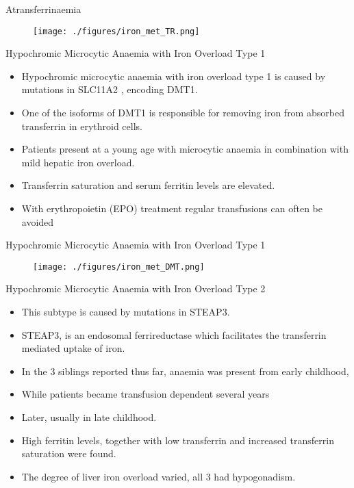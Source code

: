 \documentclass[presentation, smaller]{beamer}
\begin{document}
\begin{frame}[label={sec:orgbae116c}]{Atransferrinaemia}
\begin{figure}[htbp]
\centering
\texttt{[image: ./figures/iron\_met\_TR.png]}
\label{fig:org99f6424}
\end{figure}
\end{frame}

\begin{frame}[label={sec:org8612c05}]{Hypochromic Microcytic Anaemia with Iron Overload Type 1}
\begin{itemize}
\item Hypochromic microcytic anaemia with iron overload type 1 is caused
by mutations in SLC11A2 , encoding DMT1.
\item One of the isoforms of DMT1 is responsible for removing iron from
absorbed transferrin in erythroid cells.
\item Patients present at a young age with microcytic anaemia in combination with
mild hepatic iron overload.
\item Transferrin saturation and serum ferritin levels are elevated.
\item With erythropoietin (EPO) treatment regular transfusions can often be avoided
\end{itemize}
\end{frame}


\begin{frame}[label={sec:org6f03d0a}]{Hypochromic Microcytic Anaemia with Iron Overload Type 1}
\begin{figure}[htbp]
\centering
\texttt{[image: ./figures/iron\_met\_DMT.png]}
\label{fig:orgf687d9d}
\end{figure}
\end{frame}


\begin{frame}[label={sec:orgab1c567}]{Hypochromic Microcytic Anaemia with Iron Overload Type 2}
\begin{itemize}
\item This subtype is caused by mutations in STEAP3.
\item STEAP3, is an endosomal ferrireductase which facilitates the
transferrin mediated uptake of iron.
\item In the 3 siblings reported thus far, anaemia was present from early
childhood,
\item While patients became transfusion dependent several years
\item Later, usually in late childhood.
\item High ferritin levels, together with low transferrin and increased
transferrin saturation were found.
\item The degree of liver iron overload varied, all 3 had hypogonadism.
\end{itemize}
\end{frame}
\end{document}
